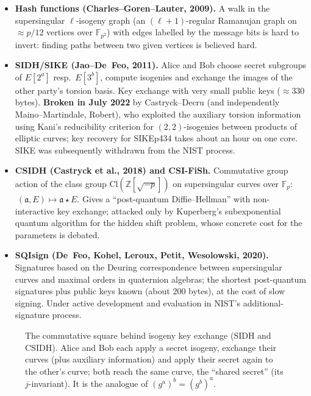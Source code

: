 \documentclass[11pt,a4paper,oneside]{book}
\theoremstyle{plain}
\theoremstyle{definition}
\theoremstyle{remark}
\newcommand{\F}{\mathbb{F}}
\begin{document}
\begin{itemize}
\item \textbf{Hash functions (Charles--Goren--Lauter, 2009).} A walk in the supersingular $\ell$-isogeny graph (an $(\ell+1)$-regular Ramanujan graph on $\approx p/12$ vertices over $\F_{p^2}$) with edges labelled by the message bits is hard to invert: finding paths between two given vertices is believed hard.
\item \textbf{SIDH/SIKE (Jao--De~Feo, 2011).} Alice and Bob choose secret subgroups of $E[2^a]$ resp.\ $E[3^b]$, compute isogenies and exchange the images of the other party's torsion basis. Key exchange with very small public keys ($\approx330$ bytes). \textbf{Broken in July 2022} by Castryck--Decru (and independently Maino--Martindale, Robert), who exploited the auxiliary torsion information using Kani's reducibility criterion for $(2,2)$-isogenies between products of elliptic curves; key recovery for SIKEp434 takes about an hour on one core. SIKE was subsequently withdrawn from the NIST process.
\item \textbf{CSIDH (Castryck et al., 2018) and CSI-FiSh.} Commutative group action of the class group $\mathrm{Cl}(\mathbb Z[\sqrt{-p}])$ on supersingular curves over $\F_p$: $\ (\mathfrak a,E)\mapsto\mathfrak a\star E$. Gives a ``post-quantum Diffie--Hellman'' with non-interactive key exchange; attacked only by Kuperberg's subexponential quantum algorithm for the hidden shift problem, whose concrete cost for the parameters is debated.
\item \textbf{SQIsign (De~Feo, Kohel, Leroux, Petit, Wesolowski, 2020).} Signatures based on the Deuring correspondence between supersingular curves and maximal orders in quaternion algebras; the shortest post-quantum signatures plus public keys known (about $200$ bytes), at the cost of slow signing. Under active development and evaluation in NIST's additional-signature process.
\end{itemize}

\begin{figure}[ht]
\centering
{}
\caption{The commutative square behind isogeny key exchange (SIDH and CSIDH). Alice and Bob each apply a secret isogeny, exchange their curves (plus auxiliary information) and apply their secret again to the other's curve; both reach the same curve, the ``shared secret'' (its $j$-invariant). It is the analogue of $(g^a)^b=(g^b)^a$.}
\end{figure}
\end{document}
